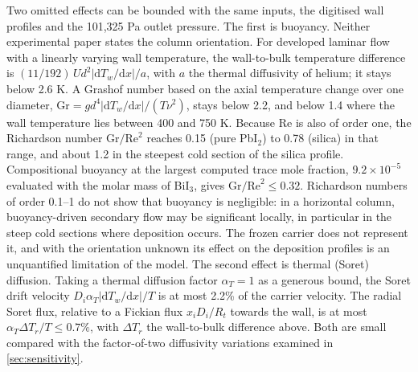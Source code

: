 Two omitted effects can be bounded with the same inputs, the digitised
wall profiles and the 101,325 Pa outlet pressure. The first is
buoyancy. Neither experimental paper states the column orientation. For
developed laminar flow with a linearly varying wall temperature, the
wall-to-bulk temperature difference is
$(11/192)\,U d^2|\mathrm{d}T_w/\mathrm{d}x|/a$, with $a$ the thermal
diffusivity of helium; it stays below 2.6 K. A Grashof number based
on the axial temperature change over one diameter,
$\mathrm{Gr}=g d^4|\mathrm{d}T_w/\mathrm{d}x|/(T\nu^2)$, stays below
2.2, and below 1.4 where the wall temperature lies between 400 and
750 K. Because Re is also of order one, the Richardson number
$\mathrm{Gr}/\mathrm{Re}^2$ reaches 0.15 (pure PbI$_2$) to 0.78
(silica) in that range, and about 1.2 in the steepest cold section of
the silica profile. Compositional buoyancy at the largest computed
trace mole fraction, $9.2\times10^{-5}$ evaluated with the molar mass
of BiI$_3$, gives $\mathrm{Gr}/\mathrm{Re}^2\le0.32$. Richardson numbers
of order 0.1--1 do not show that buoyancy is negligible: in a
horizontal column, buoyancy-driven secondary flow may be significant
locally, in particular in the steep cold sections where deposition
occurs. The frozen carrier does not represent it, and with the
orientation unknown its effect on the deposition profiles is an
unquantified limitation of the model. The second effect is thermal
(Soret) diffusion. Taking a thermal diffusion factor
$\alpha_T=1$ as a generous bound, the Soret drift velocity
$D_i\alpha_T|\mathrm{d}T_w/\mathrm{d}x|/T$ is at most 2.2\% of the
carrier velocity. The radial Soret flux, relative to a Fickian flux
$x_iD_i/R_t$ towards the wall, is at most $\alpha_T\Delta T_r/T\le0.7\%$,
with $\Delta T_r$ the wall-to-bulk difference above. Both are small
compared with the factor-of-two diffusivity variations examined in
\cref{sec:sensitivity}.

